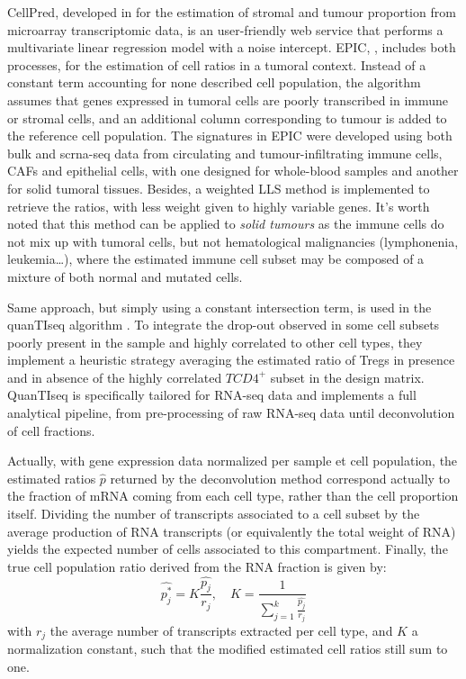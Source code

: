 CellPred, developed in \autocite{wang_etal10} for the estimation of stromal and tumour proportion from
microarray transcriptomic data, is an user-friendly web service that
performs a multivariate linear regression model with a noise intercept.
EPIC, \autocite{racle_etal17},
includes both processes, for the estimation of cell ratios in a tumoral
context. Instead of a constant term accounting for none described cell
population, the algorithm assumes that genes expressed in tumoral cells
are poorly transcribed in immune or stromal cells, and an additional
column corresponding to tumour is added to the reference cell
population. The signatures in EPIC were developed using both bulk and
 \acrshort{scrna}-seq data from circulating and tumour-infiltrating immune cells,
CAFs and epithelial cells, with one designed for whole-blood samples and
another for solid tumoral tissues. Besides, a weighted LLS method is
implemented to retrieve the ratios, with less weight given to highly
variable genes. It's worth noted that this method can be applied to
\emph{solid tumours} as the immune cells do not mix up with tumoral
cells, but not hematological malignancies (lymphonenia, leukemia\ldots),
where the estimated immune cell subset may be composed of a mixture of
both normal and mutated cells.

Same approach, but simply using a constant intersection term, is used in
the quanTIseq algorithm
\autocite{finotello_etal19}. To
integrate the drop-out observed in some cell subsets poorly present in
the sample and highly correlated to other cell types, they implement a
heuristic strategy averaging the estimated ratio of Tregs in presence
and in absence of the highly correlated \(TCD4^+\) subset in the design
matrix. QuanTIseq is specifically tailored for RNA-seq data and
implements a full analytical pipeline, from pre-processing of raw
RNA-seq data until deconvolution of cell fractions.

Actually, with gene expression data normalized per sample et cell
population, the estimated ratios \(\hat{p}\) returned by the
deconvolution method correspond actually to the fraction of mRNA coming
from each cell type, rather than the cell proportion itself. Dividing
the number of transcripts associated to a cell subset by the average
production of RNA transcripts (or equivalently the total weight of RNA)
yields the expected number of cells associated to this compartment.
Finally, the true cell population ratio derived from the RNA fraction is
given by: \[
\hat{p^*_j} = K \frac{\hat{p_j}}{r_j}, \quad K= \frac{1}{\sum_{j=1}^k \frac{\hat{p_j}}{r_j}}
\] with \(r_j\) the average number of transcripts extracted per cell
type, and \(K\) a normalization constant, such that the modified
estimated cell ratios still sum to one.

